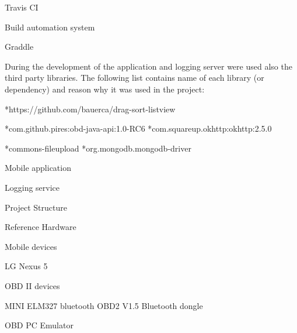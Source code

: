 Travis CI

\secc Build automation system

Graddle


During the development of the application and logging server were used also the third party libraries. The following list contains name of each library (or dependency) and reason why it was used in the project:

\begitems
	*https://github.com/bauerca/drag-sort-listview
	
	*com.github.pires:obd-java-api:1.0-RC6
	*com.squareup.okhttp:okhttp:2.5.0
	
	*commons-fileupload
	*org.mongodb.mongodb-driver
	
\enditems


\secc Mobile application

\secc Logging service

\sec Project Structure



\sec Reference Hardware

\secc Mobile devices

\seccc LG Nexus 5

\secc OBD II devices

\seccc MINI ELM327 bluetooth OBD2 V1.5 Bluetooth dongle

\seccc OBD PC Emulator
 





